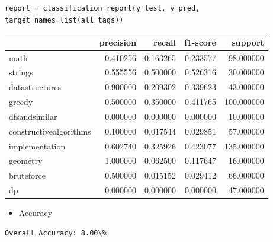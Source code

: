 \documentclass{article}
\begin{document}
\begin{verbatim}
report = classification_report(y_test, y_pred, target_names=list(all_tags))
\end{verbatim}

\begin{tabular}{lrrrr}
    \toprule
                           & precision & recall   & f1-score & support    \\
    \midrule
    math                   & 0.410256  & 0.163265 & 0.233577 & 98.000000  \\
    strings                & 0.555556  & 0.500000 & 0.526316 & 30.000000  \\
    datastructures         & 0.900000  & 0.209302 & 0.339623 & 43.000000  \\
    greedy                 & 0.500000  & 0.350000 & 0.411765 & 100.000000 \\
    dfsandsimilar          & 0.000000  & 0.000000 & 0.000000 & 10.000000  \\
    constructivealgorithms & 0.100000  & 0.017544 & 0.029851 & 57.000000  \\
    implementation         & 0.602740  & 0.325926 & 0.423077 & 135.000000 \\
    geometry               & 1.000000  & 0.062500 & 0.117647 & 16.000000  \\
    bruteforce             & 0.500000  & 0.015152 & 0.029412 & 66.000000  \\
    dp                     & 0.000000  & 0.000000 & 0.000000 & 47.000000  \\
    \bottomrule
\end{tabular}

\begin{itemize}
    \item Accuracy
\end{itemize}
\begin{verbatim}
Overall Accuracy: 8.00\%
\end{verbatim}
\end{document}
